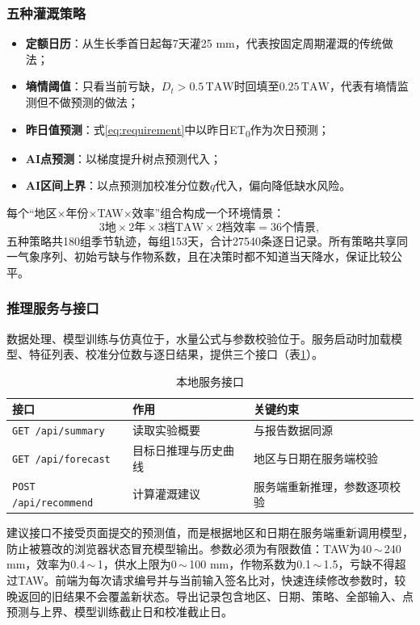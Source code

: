 \subsubsection{五种灌溉策略}
\begin{itemize}
\item \textbf{定额日历}：从生长季首日起每7天灌25 mm，代表按固定周期灌溉的传统做法；
\item \textbf{墒情阈值}：只看当前亏缺，$D_t>0.5\,\mathrm{TAW}$时回填至$0.25\,\mathrm{TAW}$，代表有墒情监测但不做预测的做法；
\item \textbf{昨日值预测}：式\eqref{eq:requirement}中以昨日ET\textsubscript{0}作为次日预测；
\item \textbf{AI点预测}：以梯度提升树点预测代入；
\item \textbf{AI区间上界}：以点预测加校准分位数$q$代入，偏向降低缺水风险。
\end{itemize}
每个“地区×年份×TAW×效率”组合构成一个环境情景：
\begin{equation}
3\text{地}\times2\text{年}\times3\text{档TAW}\times2\text{档效率}=36\text{个情景},
\end{equation}
五种策略共180组季节轨迹，每组153天，合计27540条逐日记录。所有策略共享同一气象序列、初始亏缺与作物系数，且在决策时都不知道当天降水，保证比较公平。

\subsubsection{推理服务与接口}
数据处理、模型训练与仿真位于，水量公式与参数校验位于。服务启动时加载模型、特征列表、校准分位数与逐日结果，提供三个接口（表\ref{tab:api}）。

\begin{table}[H]\centering\small
\caption{本地服务接口}\label{tab:api}
\begin{tabularx}{\linewidth}{@{}p{.30\linewidth}XX@{}}\toprule
接口 & 作用 & 关键约束\\\midrule
\texttt{GET /api/summary} & 读取实验概要 & 与报告数据同源\\
\texttt{GET /api/forecast} & 目标日推理与历史曲线 & 地区与日期在服务端校验\\
\texttt{POST /api/recommend} & 计算灌溉建议 & 服务端重新推理，参数逐项校验\\\bottomrule
\end{tabularx}
\end{table}

建议接口不接受页面提交的预测值，而是根据地区和日期在服务端重新调用模型，防止被篡改的浏览器状态冒充模型输出。参数必须为有限数值：TAW为40\,$\sim$\,240 mm，效率为0.4\,$\sim$\,1，供水上限为0\,$\sim$\,100 mm，作物系数为0.1\,$\sim$\,1.5，亏缺不得超过TAW。前端为每次请求编号并与当前输入签名比对，快速连续修改参数时，较晚返回的旧结果不会覆盖新状态。导出记录包含地区、日期、策略、全部输入、点预测与上界、模型训练截止日和校准截止日。

